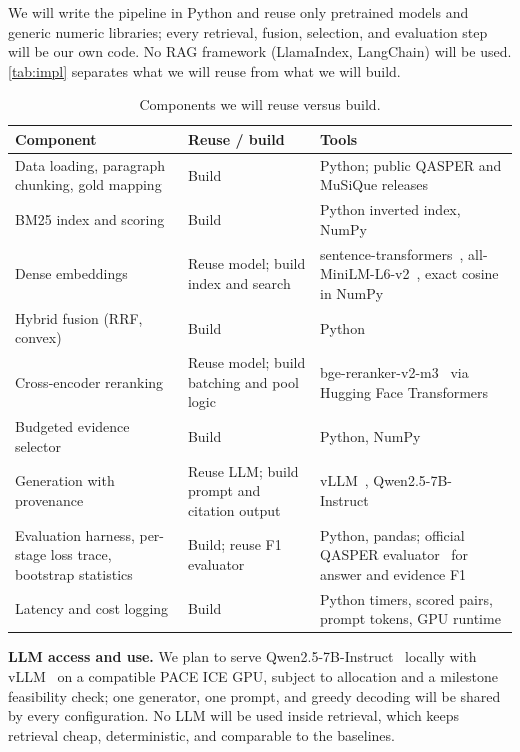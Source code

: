 \documentclass[sigconf, nonacm]{acmart}
\newcommand{\minihead}[1]{{\noindent\textbf{#1.} }}
\begin{document}
We will write the pipeline in Python and reuse only pretrained models and generic numeric libraries; every retrieval, fusion, selection, and evaluation step will be our own code. No RAG framework (LlamaIndex, LangChain) will be used. \autoref{tab:impl} separates what we will reuse from what we will build.

\begin{table}[t]
  \caption{Components we will reuse versus build.}
  \label{tab:impl}
  \footnotesize
  \begin{tabularx}{\columnwidth}{YP{1.5cm}Y}
    \toprule
    Component & Reuse / build & Tools \\
    \midrule
    Data loading, paragraph chunking, gold mapping & Build & Python; public QASPER and MuSiQue releases \\
    BM25 index and scoring & Build & Python inverted index, NumPy \\
    Dense embeddings & Reuse model; build index and search & sentence-transformers~\cite{reimers2019sbert}, all-MiniLM-L6-v2~\cite{minilmcard}, exact cosine in NumPy \\
    Hybrid fusion (RRF, convex) & Build & Python \\
    Cross-encoder reranking & Reuse model; build batching and pool logic & bge-reranker-v2-m3~\cite{bgererankercard} via Hugging Face Transformers \\
    Budgeted evidence selector & Build & Python, NumPy \\
    Generation with provenance & Reuse LLM; build prompt and citation output & vLLM~\cite{kwon2023vllm}, Qwen2.5-7B-Instruct~\cite{qwen25} \\
    Evaluation harness, per-stage loss trace, bootstrap statistics & Build; reuse F1 evaluator & Python, pandas; official QASPER evaluator~\cite{dasigi2021qasper} for answer and evidence F1 \\
    Latency and cost logging & Build & Python timers, scored pairs, prompt tokens, GPU runtime \\
    \bottomrule
  \end{tabularx}
\end{table}

\minihead{LLM access and use} We plan to serve Qwen2.5-7B-Instruct~\cite{qwen25} locally with vLLM~\cite{kwon2023vllm} on a compatible PACE ICE GPU, subject to allocation and a milestone feasibility check; one generator, one prompt, and greedy decoding will be shared by every configuration. No LLM will be used inside retrieval, which keeps retrieval cheap, deterministic, and comparable to the baselines.
\end{document}
